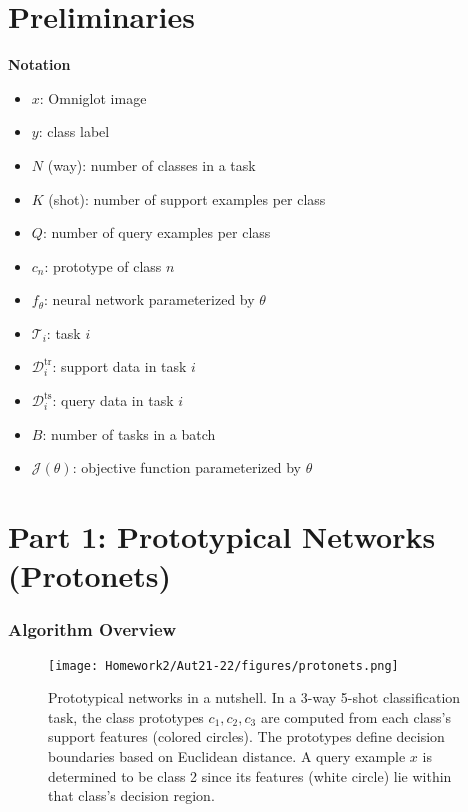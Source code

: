 \documentclass[12pt]{article}
\newcommand{\task}{\mathcal{T}}
\newcommand{\supportdata}{\mathcal{D}^\mathrm{tr}}
\newcommand{\querydata}{\mathcal{D}^\mathrm{ts}}
\begin{document}
\section*{Preliminaries}
\textbf{Notation}
\begin{itemize}
    \item $x$: Omniglot image
    \item $y$: class label
    \item $N$ (way): number of classes in a task
    \item $K$ (shot): number of support examples per class
    \item $Q$: number of query examples per class
    \item $c_n$: prototype of class $n$
    \item $f_\theta$: neural network parameterized by $\theta$
    \item $\task_i$: task $i$
    \item $\supportdata_i$: support data in task $i$
    \item $\querydata_i$: query data in task $i$
    \item $B$: number of tasks in a batch
    \item $\mathcal{J}(\theta)$: objective function parameterized by $\theta$
\end{itemize}




\newpage
\section*{Part 1: Prototypical Networks (Protonets)~\cite{prototypical}}

\subsubsection*{Algorithm Overview}
\begin{figure}[H]
\centering
\texttt{[image: Homework2/Aut21-22/figures/protonets.png]}
\vspace{-3mm}
\caption{Prototypical networks in a nutshell. In a 3-way 5-shot classification task, the class prototypes $c_1, c_2, c_3$ are computed from each class's support features (colored circles). The prototypes define decision boundaries based on Euclidean distance. A query example $x$ is determined to be class 2 since its features (white circle) lie within that class's decision region.}
\label{fig:protonet}
\end{figure}
\end{document}
